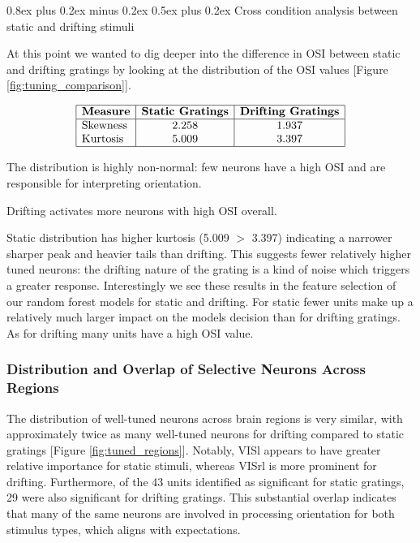 \documentclass[10pt,twocolumn]{article}
\makeatletter
\renewcommand{\subsection}{\@startsection{subsection}{2}{\z@}%
  {0.8ex plus 0.2ex minus 0.2ex}%
  {0.5ex plus 0.2ex}%
{\normalfont\normalsize\bfseries}}
\makeatother
\begin{document}
\subsection{Cross condition analysis between static and drifting stimuli}

At this point we wanted to dig deeper into the difference in OSI between static and drifting gratings by looking at the distribution of the OSI values [Figure \ref{fig:tuning_comparison}].

\[
  \begin{array}{|l|c|c|}
    \hline
    \textbf{Measure} & \textbf{Static Gratings} & \textbf{Drifting Gratings} \\
    \hline
    \text{Skewness} & 2.258 & 1.937 \\
    \text{Kurtosis} & 5.009 & 3.397 \\
    \hline
  \end{array}
\]

The distribution is highly non-normal: few neurons have a high OSI and are responsible for interpreting orientation.

Drifting activates more neurons with high OSI overall.

Static distribution has higher kurtosis (5.009 $>$ 3.397) indicating a narrower sharper peak and heavier tails than drifting. This suggests fewer relatively higher tuned neurons: the drifting nature of the grating is a kind of noise which triggers a greater response. Interestingly we see these results in the feature selection of our random forest models for static and drifting. For static fewer units make up a relatively much larger impact on the models decision than for drifting gratings. As for drifting many units have a high OSI value.

\subsubsection{Distribution and Overlap of Selective Neurons Across Regions}

The distribution of well-tuned neurons across brain regions is very similar, with approximately twice as many well-tuned neurons for drifting compared to static gratings [Figure \ref{fig:tuned_regions}]. Notably, VISl appears to have greater relative importance for static stimuli, whereas VISrl is more prominent for drifting. Furthermore, of the 43 units identified as significant for static gratings, 29 were also significant for drifting gratings. This substantial overlap indicates that many of the same neurons are involved in processing orientation for both stimulus types, which aligns with expectations.
\end{document}
